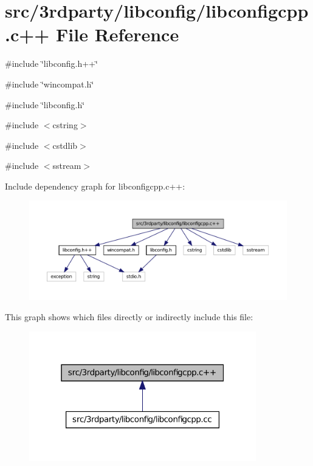 \hypertarget{libconfigcpp_8c_09_09}{
\section{src/3rdparty/libconfig/libconfigcpp.c++ File Reference}
\label{libconfigcpp_8c_09_09}
}
{\ttfamily \#include \char`\"{}libconfig.h++\char`\"{}}\par
{\ttfamily \#include \char`\"{}wincompat.h\char`\"{}}\par
{\ttfamily \#include \char`\"{}libconfig.h\char`\"{}}\par
{\ttfamily \#include $<$cstring$>$}\par
{\ttfamily \#include $<$cstdlib$>$}\par
{\ttfamily \#include $<$sstream$>$}\par
Include dependency graph for libconfigcpp.c++:
\nopagebreak
\begin{figure}[H]
\begin{center}
\leavevmode
\includegraphics[width=400pt]{libconfigcpp_8c_09_09__incl}
\end{center}
\end{figure}
This graph shows which files directly or indirectly include this file:
\nopagebreak
\begin{figure}[H]
\begin{center}
\leavevmode
\includegraphics[width=280pt]{libconfigcpp_8c_09_09__dep__incl}
\end{center}
\end{figure}
